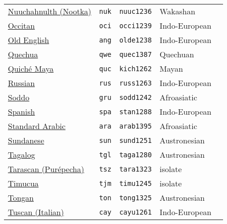 \begin{longtable}[c]{ l l l l l }
  \href{https://glottolog.org/resource/languoid/id/nuuc1236}{Nuuchahnulth (Nootka)}  & \texttt{nuk}       & \texttt{nuuc1236}   & Wakashan\\
  \href{https://glottolog.org/resource/languoid/id/occi1239}{Occitan}                & \texttt{oci}       & \texttt{occi1239}   & Indo-European\\
  \href{https://glottolog.org/resource/languoid/id/olde1238}{Old English}            & \texttt{ang}       & \texttt{olde1238}   & Indo-European\\
  \href{https://glottolog.org/resource/languoid/id/quec1387}{Quechua}                & \texttt{qwe}       & \texttt{quec1387}   & Quechuan\\
  \href{https://glottolog.org/resource/languoid/id/kich1262}{Quiché Maya}            & \texttt{quc}       & \texttt{kich1262}   & Mayan\\
  \href{https://glottolog.org/resource/languoid/id/russ1263}{Russian}                & \texttt{rus}       & \texttt{russ1263}   & Indo-European\\
  \href{https://glottolog.org/resource/languoid/id/sodd1242}{Soddo}                  & \texttt{gru}       & \texttt{sodd1242}   & Afroasiatic\\
  \href{https://glottolog.org/resource/languoid/id/stan1288}{Spanish}                & \texttt{spa}       & \texttt{stan1288}   & Indo-European\\
  \href{https://glottolog.org/resource/languoid/id/arab1395}{Standard Arabic}        & \texttt{ara}       & \texttt{arab1395}   & Afroasiatic\\
  \href{https://glottolog.org/resource/languoid/id/sund1251}{Sundanese}              & \texttt{sun}       & \texttt{sund1251}   & Austronesian\\
  \href{https://glottolog.org/resource/languoid/id/taga1280}{Tagalog}                & \texttt{tgl}       & \texttt{taga1280}   & Austronesian\\
  \href{https://glottolog.org/resource/languoid/id/tara1323}{Tarascan (Purépecha)}   & \texttt{tsz}       & \texttt{tara1323}   & isolate\\
  \href{https://glottolog.org/resource/languoid/id/timu1245}{Timucua}                & \texttt{tjm}       & \texttt{timu1245}   & isolate\\
  \href{https://glottolog.org/resource/languoid/id/tong1325}{Tongan}                 & \texttt{ton}       & \texttt{tong1325}   & Austronesian\\
  \href{https://glottolog.org/resource/languoid/id/cayu1261}{Tuscan (Italian)}       & \texttt{cay}       & \texttt{cayu1261}   & Indo-European\\

\end{longtable}
